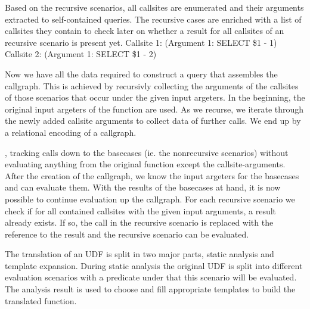 Based on the recursive scenarios, all callsites are enumerated and their arguments extracted to self-contained queries. The recursive cases are enriched with a list of callsites they contain to check later on whether a result for all callsites of an recursive scenario is present yet.
  Callsite 1: (Argument 1: SELECT \$1 - 1) 
  Callsite 2: (Argument 1: SELECT \$1 - 2)
  
Now we have all the data required to construct a query that assembles the callgraph. This is achieved by recursivly collecting the arguments of the callsites of those scenarios that occur under the given input argeters. In the beginning, the original input argeters of the function are used. As we recurse, we iterate through the newly added callsite arguments to collect data of further calls. We end up by a relational encoding of a callgraph.


, tracking calls down to the basecases (ie. the nonrecursive scenarios) without evaluating anything from the original function except the callsite-arguments. After the creation of the callgraph, we know the input argeters for the basecases and can evaluate them. With the results of the basecases at hand, it is now possible to continue evaluation up the callgraph. For each recursive scenario we check if for all contained callsites with the given input arguments, a result already exists. If so, the call in the recursive scenario is replaced with the reference to the result and the recursive scenario can be evaluated.

The translation of an UDF is split in two major parts, static analysis and template expansion. During static analysis the original UDF is split into different evaluation scenarios with a predicate under that this scenario will be evaluated. The analysis result is used to choose and fill appropriate templates to build the translated function.

